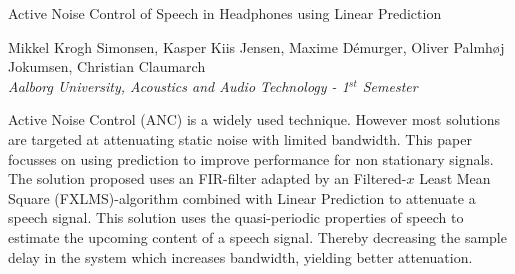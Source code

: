
\begin{center}
\begin{huge}
Active Noise Control of Speech in Headphones using Linear Prediction  
\end{huge}

\vspace{5mm}
Mikkel Krogh Simonsen, Kasper Kiis Jensen, Maxime Démurger, Oliver Palmhøj Jokumsen, Christian Claumarch
\\
\textit{Aalborg University, Acoustics and Audio Technology - 1$^{st}$ Semester}


\vspace{5mm}

Active Noise Control (ANC) is a widely used technique. However most solutions are targeted at attenuating static noise with limited bandwidth. This paper focusses on using prediction to improve performance for non stationary signals.
The solution proposed uses an FIR-filter adapted by an Filtered-$x$ Least Mean Square (FXLMS)-algorithm combined with Linear Prediction to attenuate a speech signal. This solution uses the quasi-periodic properties of speech to estimate the upcoming content of a speech signal. Thereby decreasing the sample delay in the system which increases bandwidth, yielding better attenuation.















\end{center}